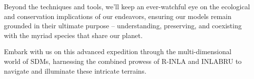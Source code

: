 \documentclass[
]{krantz}
\begin{document}
Beyond the techniques and tools, we'll keep an ever-watchful eye on the ecological and conservation implications of our endeavors, ensuring our models remain grounded in their ultimate purpose -- understanding, preserving, and coexisting with the myriad species that share our planet.

Embark with us on this advanced expedition through the multi-dimensional world of SDMs, harnessing the combined prowess of R-INLA and INLABRU to navigate and illuminate these intricate terrains.

  

\backmatter
\printindex

\linespread{1.213}
\end{document}
